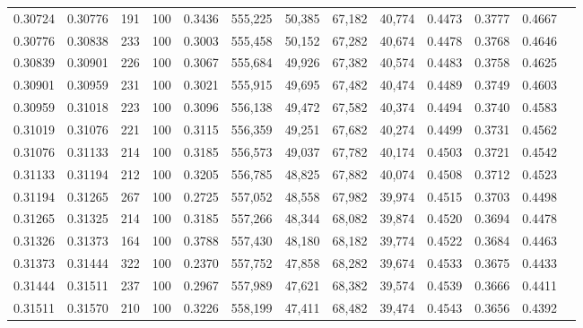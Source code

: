 \begin{tabular}{rrrrrrrrrrrrr}
0.30724 & 0.30776 &   191 & 100 &                                     0.3436 & 555,225 &  50,385 &  67,182 &  40,774 & 0.4473 & 0.3777 & 0.4667 \\
0.30776 & 0.30838 &   233 & 100 &                                     0.3003 & 555,458 &  50,152 &  67,282 &  40,674 & 0.4478 & 0.3768 & 0.4646 \\
0.30839 & 0.30901 &   226 & 100 &                                     0.3067 & 555,684 &  49,926 &  67,382 &  40,574 & 0.4483 & 0.3758 & 0.4625 \\
0.30901 & 0.30959 &   231 & 100 &                                     0.3021 & 555,915 &  49,695 &  67,482 &  40,474 & 0.4489 & 0.3749 & 0.4603 \\
0.30959 & 0.31018 &   223 & 100 &                                     0.3096 & 556,138 &  49,472 &  67,582 &  40,374 & 0.4494 & 0.3740 & 0.4583 \\
0.31019 & 0.31076 &   221 & 100 &                                     0.3115 & 556,359 &  49,251 &  67,682 &  40,274 & 0.4499 & 0.3731 & 0.4562 \\
0.31076 & 0.31133 &   214 & 100 &                                     0.3185 & 556,573 &  49,037 &  67,782 &  40,174 & 0.4503 & 0.3721 & 0.4542 \\
0.31133 & 0.31194 &   212 & 100 &                                     0.3205 & 556,785 &  48,825 &  67,882 &  40,074 & 0.4508 & 0.3712 & 0.4523 \\
0.31194 & 0.31265 &   267 & 100 &                                     0.2725 & 557,052 &  48,558 &  67,982 &  39,974 & 0.4515 & 0.3703 & 0.4498 \\
0.31265 & 0.31325 &   214 & 100 &                                     0.3185 & 557,266 &  48,344 &  68,082 &  39,874 & 0.4520 & 0.3694 & 0.4478 \\
0.31326 & 0.31373 &   164 & 100 &                                     0.3788 & 557,430 &  48,180 &  68,182 &  39,774 & 0.4522 & 0.3684 & 0.4463 \\
0.31373 & 0.31444 &   322 & 100 &                                     0.2370 & 557,752 &  47,858 &  68,282 &  39,674 & 0.4533 & 0.3675 & 0.4433 \\
0.31444 & 0.31511 &   237 & 100 &                                     0.2967 & 557,989 &  47,621 &  68,382 &  39,574 & 0.4539 & 0.3666 & 0.4411 \\
0.31511 & 0.31570 &   210 & 100 &                                     0.3226 & 558,199 &  47,411 &  68,482 &  39,474 & 0.4543 & 0.3656 & 0.4392 \\

\end{tabular}
